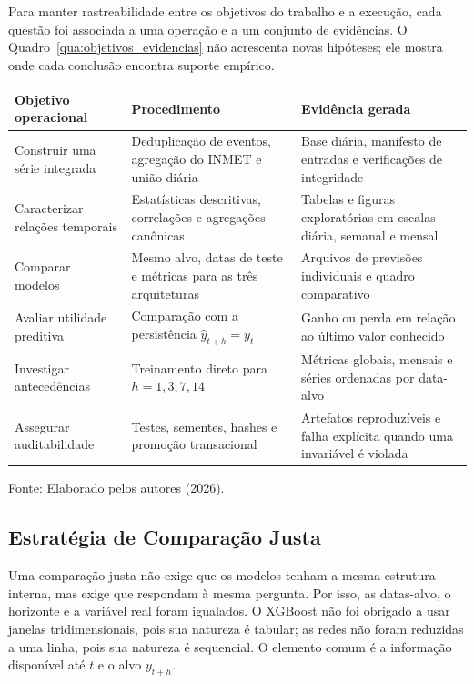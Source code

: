 Para manter rastreabilidade entre os objetivos do trabalho e a execução, cada questão foi associada a uma operação e a um conjunto de evidências. O Quadro~\ref{qua:objetivos_evidencias} não acrescenta novas hipóteses; ele mostra onde cada conclusão encontra suporte empírico.

\begin{quadro}[H]
\centering
\caption{Relação entre objetivos, operações e evidências}
\label{qua:objetivos_evidencias}
\small
\begin{tabularx}{\textwidth}{p{3.7cm} X X}
\toprule
\textbf{Objetivo operacional} & \textbf{Procedimento} & \textbf{Evidência gerada} \\
\midrule
Construir uma série integrada & Deduplicação de eventos, agregação do INMET e união diária & Base diária, manifesto de entradas e verificações de integridade \\
Caracterizar relações temporais & Estatísticas descritivas, correlações e agregações canônicas & Tabelas e figuras exploratórias em escalas diária, semanal e mensal \\
Comparar modelos & Mesmo alvo, datas de teste e métricas para as três arquiteturas & Arquivos de previsões individuais e quadro comparativo \\
Avaliar utilidade preditiva & Comparação com a persistência $\widehat y_{t+h}=y_t$ & Ganho ou perda em relação ao último valor conhecido \\
Investigar antecedências & Treinamento direto para $h=1,3,7,14$ & Métricas globais, mensais e séries ordenadas por data-alvo \\
Assegurar auditabilidade & Testes, sementes, hashes e promoção transacional & Artefatos reproduzíveis e falha explícita quando uma invariável é violada \\
\bottomrule
\end{tabularx}
\small{Fonte: Elaborado pelos autores (2026).}
\end{quadro}

\subsection{Estratégia de Comparação Justa}

Uma comparação justa não exige que os modelos tenham a mesma estrutura interna, mas exige que respondam à mesma pergunta. Por isso, as datas-alvo, o horizonte e a variável real foram igualados. O XGBoost não foi obrigado a usar janelas tridimensionais, pois sua natureza é tabular; as redes não foram reduzidas a uma linha, pois sua natureza é sequencial. O elemento comum é a informação disponível até $t$ e o alvo $y_{t+h}$.

